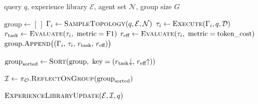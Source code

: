 \begin{algorithm}[H]
\caption{OrchestratorUpdate (GRPO-style)}
\begin{algorithmic}[1]
\Require query $q$, experience library $\mathcal{E}$, agent set $\mathcal{N}$, group size $G$

\State $\text{group} \leftarrow [\,]$
    \State $\Gamma_i \leftarrow \textsc{SampleTopology}(q, \mathcal{E}, \mathcal{N})$
    \State $\tau_i \leftarrow \textsc{Execute}(\Gamma_i, q, \mathcal{D})$
    \State $r_{\text{task}} \leftarrow \textsc{Evaluate}(\tau_i,\ \text{metric}=\text{F1})$
    \State $r_{\text{eff}} \leftarrow \textsc{Evaluate}(\tau_i,\ \text{metric}=\text{token\_cost})$
    \State $\text{group}.\textsc{Append}\bigl((\Gamma_i,\, \tau_i,\, r_{\text{task}},\, r_{\text{eff}})\bigr)$
\EndFor

    \State \Return
\EndIf

\State $\text{group}_{\text{sorted}} \leftarrow \textsc{Sort}\!\left(\text{group},\ \text{key}=(r_{\text{task}}{\downarrow},\, r_{\text{eff}}{\uparrow})\right)$

\State $\mathcal{I} \leftarrow \pi_{\mathcal{O}}.\textsc{ReflectOnGroup}(\text{group}_{\text{sorted}})$

\State $\textsc{ExperienceLibraryUpdate}(\mathcal{E}, \mathcal{I}, q)$
\end{algorithmic}
\end{algorithm}


